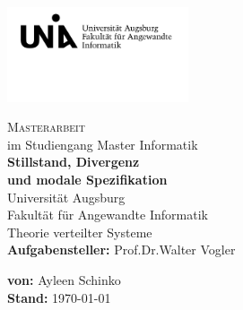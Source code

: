\begin{titlepage}
\includegraphics[width=0.4\textwidth]{Uni_Aug_Logo_FAI_schwarz.png}
\vspace{-1cm}
\begin{center}
  \LARGE \textsc{Masterarbeit}\\
  \normalsize im Studiengang Master Informatik\\
  \vfill
  \Huge \textbf{\textsf{Stillstand, Divergenz\\
  und modale Spezifikation}}\\
  \vfill
  \Large Universität Augsburg\\
  Fakultät für Angewandte Informatik\\
  Theorie verteilter Systeme\\
  \vspace{2cm}
  \rmfamily \large \textbf{Aufgabensteller:} Prof.\;Dr.\;Walter Vogler
\end{center}
\vspace{1.5cm}
\large \textbf{%
  von:}
Ayleen Schinko\\
\textbf{%
  Stand:}
\today\\
\end{titlepage}
